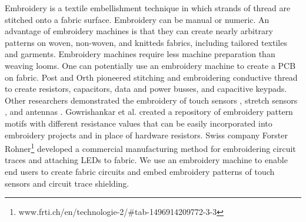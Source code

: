 Embroidery is a textile  embellishment technique in which strands of thread are stitched onto a fabric surface. Embroidery can be manual or numeric. An advantage of embroidery machines is that they can create nearly arbitrary patterns on woven, non-woven, and knitteds fabrics, including tailored textiles and garments. Embroidery machines require less machine preparation than weaving looms.
One can potentially use an embroidery machine to create a PCB on fabric. 
Post and Orth \cite{5387040} pioneered stitching and embroidering conductive thread to create resistors, capacitors, data and power busses, and capacitive keypads. 
Other researchers demonstrated the embroidery of touch sensors \cite{hamdan2016grabbing,roh2014textile,zeagler2012textile}, stretch sensors \cite{vogl2017stretcheband}, and antennas \cite{brechet2017cost}. Gowrishankar et al. \cite{Gowrishankar:2013:PRE:2493988.2494341} created a repository of embroidery pattern motifs
with different resistance values that can be easily incorporated into embroidery projects and in place of hardware resistors. Swiss company Forster Rohner\footnote{www.frti.ch/en/technologie-2/#tab-1496914209772-3-3}
developed a commercial manufacturing method for embroidering circuit traces and attaching LEDs to fabric. 
We use an embroidery machine to enable end users to create fabric circuits and embed embroidery patterns of touch sensors and circuit trace shielding.






